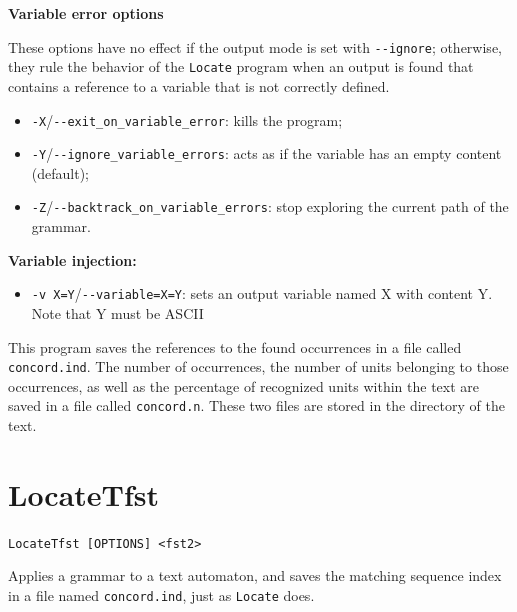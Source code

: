 \bigskip
\noindent \textbf{Variable error options}

\noindent These options have no effect if the output mode is set with
\verb+--ignore+; otherwise, they rule the behavior of the \verb+Locate+ program
when an output is found that contains a reference to a variable that is not correctly defined.
\begin{itemize}
  \item \verb+-X+/\verb+--exit_on_variable_error+: kills the program;
  \item \verb+-Y+/\verb+--ignore_variable_errors+: acts as if the variable has
  an empty content (default);
  \item \verb+-Z+/\verb+--backtrack_on_variable_errors+: stop exploring the
  current path of the grammar.
\end{itemize}
  
\bigskip
\noindent \textbf{Variable injection:}
\begin{itemize}
	\item \verb+-v X=Y+/\verb+--variable=X=Y+: sets an output variable named X with content Y. 
	Note that Y must be ASCII
\end{itemize}

\bigskip
\noindent {}This 
program saves the references to the found occurrences in a file called
\verb+concord.ind+. The number of occurrences, the number of units belonging to
those occurrences, as well as the percentage of recognized units within the text
are saved in a file called \verb+concord.n+. These two files are stored in the
directory of the text.







\section{LocateTfst}
\label{section-LocateTfst}
\verb+LocateTfst [OPTIONS] <fst2>+

\bigskip
\noindent {}
Applies a grammar to a text automaton, and saves the matching sequence index in a
file named \verb+concord.ind+, just as \verb+Locate+ does.

